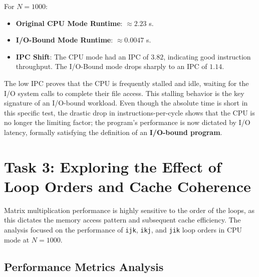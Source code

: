 \documentclass[11pt, a4paper]{article}
\begin{document}
For $N=1000$:
\begin{itemize}
    \item \textbf{Original CPU Mode Runtime}: $\approx 2.23$ s.
    \item \textbf{I/O-Bound Mode Runtime}: $\approx 0.0047$ s.
    \item \textbf{IPC Shift}: The CPU mode had an IPC of $\mathbf{3.82}$, indicating good instruction throughput. The I/O-Bound mode drops sharply to an IPC of $\mathbf{1.14}$.
\end{itemize}
The low IPC proves that the CPU is frequently stalled and idle, waiting for the I/O system calls to complete their file access. This stalling behavior is the key signature of an I/O-bound workload. Even though the absolute time is short in this specific test, the drastic drop in instructions-per-cycle shows that the CPU is no longer the limiting factor; the program's performance is now dictated by I/O latency, formally satisfying the definition of an \textbf{I/O-bound program}.

\section{Task 3: Exploring the Effect of Loop Orders and Cache Coherence}

Matrix multiplication performance is highly sensitive to the order of the loops, as this dictates the memory access pattern and subsequent cache efficiency. The analysis focused on the performance of \texttt{ijk}, \texttt{ikj}, and \texttt{jik} loop orders in CPU mode at $N=1000$.
\subsection{Performance Metrics Analysis}
\end{document}
